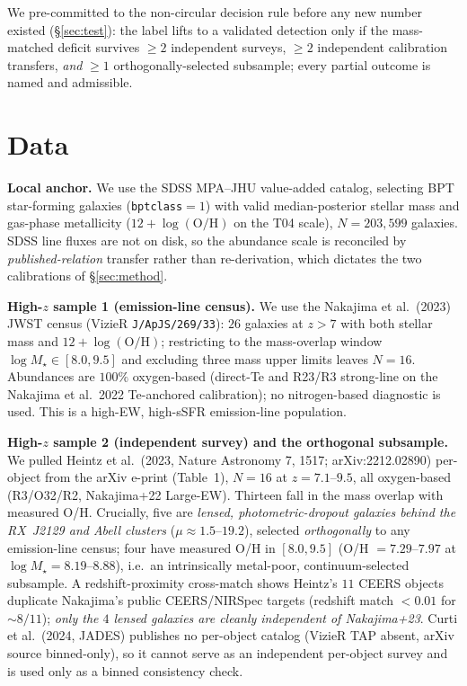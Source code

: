 \documentclass[twocolumn]{aastex631}
\begin{document}
We pre-committed to the non-circular decision rule before any new number existed (\S\ref{sec:test}): the label lifts to a validated detection only if the mass-matched deficit survives $\geq2$ independent surveys, $\geq2$ independent calibration transfers, \emph{and} $\geq1$ orthogonally-selected subsample; every partial outcome is named and admissible.

\section{Data}
\textbf{Local anchor.} We use the SDSS MPA--JHU value-added catalog, selecting BPT star-forming galaxies (\texttt{bptclass}$=1$) with valid median-posterior stellar mass and gas-phase metallicity ($12+\log(\mathrm{O/H})$ on the T04 scale), $N=203{,}599$ galaxies. SDSS line fluxes are not on disk, so the abundance scale is reconciled by \emph{published-relation} transfer rather than re-derivation, which dictates the two calibrations of \S\ref{sec:method}.

\textbf{High-$z$ sample 1 (emission-line census).} We use the Nakajima et al.\ (2023) JWST census (VizieR \texttt{J/ApJS/269/33}): $26$ galaxies at $z>7$ with both stellar mass and $12+\log(\mathrm{O/H})$; restricting to the mass-overlap window $\log M_\star\in[8.0,9.5]$ and excluding three mass upper limits leaves $N=16$. Abundances are $100\%$ oxygen-based (direct-Te and R23/R3 strong-line on the Nakajima et al.\ 2022 Te-anchored calibration); no nitrogen-based diagnostic is used. This is a high-EW, high-sSFR emission-line population.

\textbf{High-$z$ sample 2 (independent survey) and the orthogonal subsample.} We pulled Heintz et al.\ (2023, Nature Astronomy 7, 1517; arXiv:2212.02890) per-object from the arXiv e-print (Table~1), $N=16$ at $z=7.1$--$9.5$, all oxygen-based (R3/O32/R2, Nakajima+22 Large-EW). Thirteen fall in the mass overlap with measured O/H. Crucially, five are \emph{lensed, photometric-dropout galaxies behind the RX~J2129 and Abell clusters} ($\mu\approx1.5$--$19.2$), selected \emph{orthogonally} to any emission-line census; four have measured O/H in $[8.0,9.5]$ (O/H $=7.29$--$7.97$ at $\log M_\star=8.19$--$8.88$), i.e.\ an intrinsically metal-poor, continuum-selected subsample. A redshift-proximity cross-match shows Heintz's $11$ CEERS objects duplicate Nakajima's public CEERS/NIRSpec targets (redshift match $<0.01$ for $\sim8/11$); \emph{only the $4$ lensed galaxies are cleanly independent of Nakajima+23}. Curti et al.\ (2024, JADES) publishes no per-object catalog (VizieR TAP absent, arXiv source binned-only), so it cannot serve as an independent per-object survey and is used only as a binned consistency check.
\end{document}
